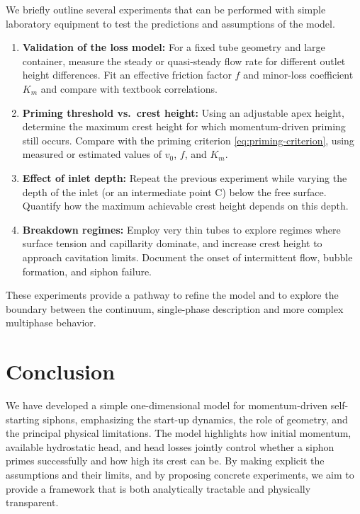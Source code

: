 \documentclass[11pt]{article}
\begin{document}
We briefly outline several experiments that can be performed with simple laboratory equipment to test the predictions and assumptions of the model.

\begin{enumerate}
  \item \textbf{Validation of the loss model:}
  For a fixed tube geometry and large container, measure the steady or quasi-steady flow rate for different outlet height differences.
  Fit an effective friction factor $f$ and minor-loss coefficient $K_m$ and compare with textbook correlations.

  \item \textbf{Priming threshold vs.\ crest height:}
  Using an adjustable apex height, determine the maximum crest height for which momentum-driven priming still occurs.
  Compare with the priming criterion \eqref{eq:priming-criterion}, using measured or estimated values of $v_0$, $f$, and $K_m$.

  \item \textbf{Effect of inlet depth:}
  Repeat the previous experiment while varying the depth of the inlet (or an intermediate point C) below the free surface.
  Quantify how the maximum achievable crest height depends on this depth.

  \item \textbf{Breakdown regimes:}
  Employ very thin tubes to explore regimes where surface tension and capillarity dominate, and increase crest height to approach cavitation limits.
  Document the onset of intermittent flow, bubble formation, and siphon failure.
\end{enumerate}

These experiments provide a pathway to refine the model and to explore the boundary between the continuum, single-phase description and more complex multiphase behavior.

\section{Conclusion}

We have developed a simple one-dimensional model for momentum-driven self-starting siphons, emphasizing the start-up dynamics, the role of geometry, and the principal physical limitations.
The model highlights how initial momentum, available hydrostatic head, and head losses jointly control whether a siphon primes successfully and how high its crest can be.
By making explicit the assumptions and their limits, and by proposing concrete experiments, we aim to provide a framework that is both analytically tractable and physically transparent.
\end{document}
